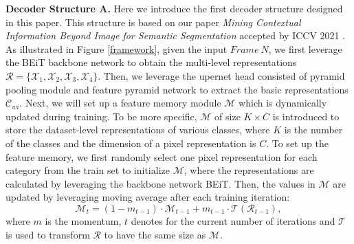 \documentclass[10pt,twocolumn,letterpaper]{article}
\begin{document}
\noindent \textbf{Decoder Structure A.} 
Here we introduce the first decoder structure designed in this paper.
This structure is based on our paper \emph{Mining Contextual Information Beyond Image for Semantic Segmentation} accepted by ICCV 2021 \cite{jin2021mining}.
As illustrated in Figure \ref{framework}, given the input $Frame~N$, we first leverage the BEiT backbone network to obtain the multi-level representations $\mathcal{R} = \{\mathcal{X}_1, \mathcal{X}_2, \mathcal{X}_3, \mathcal{X}_4\}$.
Then, we leverage the upernet head consisted of pyramid pooling module \cite{zhao2017pyramid} and feature pyramid network \cite{lin2017feature} to 
extract the basic representations $\mathcal{C}_{wi}$.
Next, we will set up a feature memory module $\mathcal{M}$ which is dynamically updated during training.
To be more specific, $\mathcal{M}$ of size $K \times C$ is introduced to store the dataset-level representations of various classes,
where $K$ is the number of the classes and the dimension of a pixel representation is $C$.
To set up the feature memory, we first randomly select one pixel representation for each category from the train set to initialize $\mathcal{M}$, where the representations are calculated by leveraging the backbone network BEiT.
Then, the values in $\mathcal{M}$ are updated by leveraging moving average after each training iteration:
\begin{equation} \label{eq1}
   \mathcal{M}_{t} = (1 - m_{t-1}) \cdot \mathcal{M}_{t-1} + m_{t-1} \cdot \mathscr{T}(\mathcal{R}_{t-1}),
\end{equation}
where $m$ is the momentum, $t$ denotes for the current number of iterations and $\mathscr{T}$ is used to transform $\mathcal{R}$ to have the same size as $\mathcal{M}$.
\end{document}
